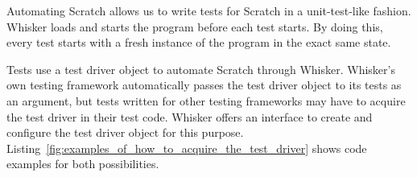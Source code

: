 
Automating Scratch allows us to write tests for Scratch in a unit-test-like fashion.
Whisker loads and starts the program before each test starts.
By doing this, every test starts with a fresh instance of the program in the exact same state.
\parspace

Tests use a test driver object to automate Scratch through Whisker.
Whisker's own testing framework automatically passes the test driver object to its tests as an argument,
but tests written for other testing frameworks may have to acquire the test driver in their test code.
Whisker offers an interface to create and configure the test driver object for this purpose.
Listing~\ref{fig:examples_of_how_to_acquire_the_test_driver} shows code examples for both possibilities.
\parspace

